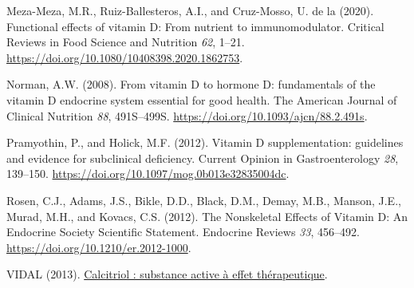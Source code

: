 \documentclass[
  letterpaper,
  DIV=11,
  numbers=noendperiod]{scrartcl}
\newlength{\cslhangindent}
\newlength{\cslentryspacingunit} %
\newenvironment{CSLReferences}[2] %
 {%
  \setlength{\parindent}{0pt}
  \ifodd #1
  \let\oldpar\par
  \def\par{\hangindent=\cslhangindent\oldpar}
  \fi
  \setlength{\parskip}{#2\cslentryspacingunit}
 }%
 {}
\begin{document}
\begin{CSLReferences}{0}{0}
\leavevmode{}%
Meza-Meza, M.R., Ruiz-Ballesteros, A.I., and Cruz-Mosso, U. de la
(2020). {Functional effects of vitamin D: From nutrient to
immunomodulator}. Critical Reviews in Food Science and Nutrition
\emph{62}, 1--21. \url{https://doi.org/10.1080/10408398.2020.1862753}.

\leavevmode{}%
Norman, A.W. (2008). {From vitamin D to hormone D: fundamentals of the
vitamin D endocrine system essential for good health}. The American
Journal of Clinical Nutrition \emph{88}, 491S--499S.
\url{https://doi.org/10.1093/ajcn/88.2.491s}.

\leavevmode{}%
Pramyothin, P., and Holick, M.F. (2012). {Vitamin D supplementation:
guidelines and evidence for subclinical deficiency}. Current Opinion in
Gastroenterology \emph{28}, 139--150.
\url{https://doi.org/10.1097/mog.0b013e32835004dc}.

\leavevmode{}%
Rosen, C.J., Adams, J.S., Bikle, D.D., Black, D.M., Demay, M.B., Manson,
J.E., Murad, M.H., and Kovacs, C.S. (2012). {The Nonskeletal Effects of
Vitamin D: An Endocrine Society Scientific Statement}. Endocrine Reviews
\emph{33}, 456--492. \url{https://doi.org/10.1210/er.2012-1000}.

\leavevmode{}%
VIDAL (2013).
\href{https://www.vidal.fr/medicaments/substances/calcitriol-4158.html}{{Calcitriol
: substance active à effet thérapeutique}}.

\end{CSLReferences}
\end{document}
